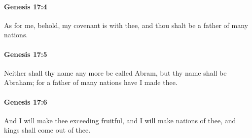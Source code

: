 		\paragraph{Genesis 17:4} %
			\label{GENESIS-17-4}

			As for me, behold, my covenant is with thee, and thou shalt be a father of many nations.


		\paragraph{Genesis 17:5} %
			\label{GENESIS-17-5}

			Neither shall thy name any more be called Abram, but thy name shall be Abraham; for a father of many nations have I made thee.


		\paragraph{Genesis 17:6} %
			\label{GENESIS-17-6}

			And I will make thee exceeding fruitful, and I will make nations of thee, and kings shall come out of thee.


